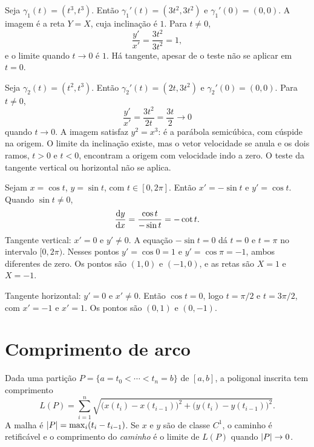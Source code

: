 \documentclass[11pt,a4paper]{article}
\begin{document}

\begin{contraexemplo}
Seja \(\gamma_{1}(t)=(t^{3},t^{3})\). Então \(\gamma_{1}'(t)=(3t^{2},3t^{2})\) e \(\gamma_{1}'(0)=(0,0)\). A imagem é a reta \(Y=X\), cuja inclinação é \(1\). Para \(t\neq 0\),
\[
\frac{y'}{x'}=\frac{3t^{2}}{3t^{2}}=1,
\]
e o limite quando \(t\to 0\) é \(1\). Há tangente, apesar de o teste não se aplicar em \(t=0\).

Seja \(\gamma_{2}(t)=(t^{2},t^{3})\). Então \(\gamma_{2}'(t)=(2t,3t^{2})\) e \(\gamma_{2}'(0)=(0,0)\). Para \(t\neq 0\),
\[
\frac{y'}{x'}=\frac{3t^{2}}{2t}=\frac{3t}{2}\to 0
\]
quando \(t\to 0\). A imagem satisfaz \(y^{2}=x^{3}\): é a parábola semicúbica, com cúspide na origem. O limite da inclinação existe, mas o vetor velocidade se anula e os dois ramos, \(t>0\) e \(t<0\), encontram a origem com velocidade indo a zero. O teste da tangente vertical ou horizontal não se aplica.
\end{contraexemplo}

\begin{exemplo}[A circunferência]
Sejam \(x=\cos t\), \(y=\sin t\), com \(t\in[0,2\pi]\). Então \(x'=-\sin t\) e \(y'=\cos t\). Quando \(\sin t\neq 0\),
\[
\frac{\mathrm{d} y}{\mathrm{d} x}
=\frac{\cos t}{-\sin t}=-\cot t.
\]
Tangente vertical: \(x'=0\) e \(y'\neq 0\). A equação \(-\sin t=0\) dá \(t=0\) e \(t=\pi\) no intervalo \([0,2\pi)\). Nesses pontos \(y'=\cos 0=1\) e \(y'=\cos\pi=-1\), ambos diferentes de zero. Os pontos são \((1,0)\) e \((-1,0)\), e as retas são \(X=1\) e \(X=-1\).

Tangente horizontal: \(y'=0\) e \(x'\neq 0\). Então \(\cos t=0\), logo \(t=\pi/2\) e \(t=3\pi/2\), com \(x'=-1\) e \(x'=1\). Os pontos são \((0,1)\) e \((0,-1)\).
\end{exemplo}

\section{Comprimento de arco}

\begin{definicao}
Dada uma partição \(P=\{a=t_{0}<\cdots<t_{n}=b\}\) de \([a,b]\), a poligonal inscrita tem comprimento
\[
L(P)=\sum_{i=1}^{n}\sqrt{\bigl(x(t_{i})-x(t_{i-1})\bigr)^{2}+\bigl(y(t_{i})-y(t_{i-1})\bigr)^{2}}.
\]
A malha é \(\left\lvert P \right\rvert=\max_{i}(t_{i}-t_{i-1})\). Se \(x\) e \(y\) são de classe \(C^1\), o caminho é retificável e o comprimento do \emph{caminho} é o limite de \(L(P)\) quando \(\left\lvert P \right\rvert\to 0\).
\end{definicao}
\end{document}
